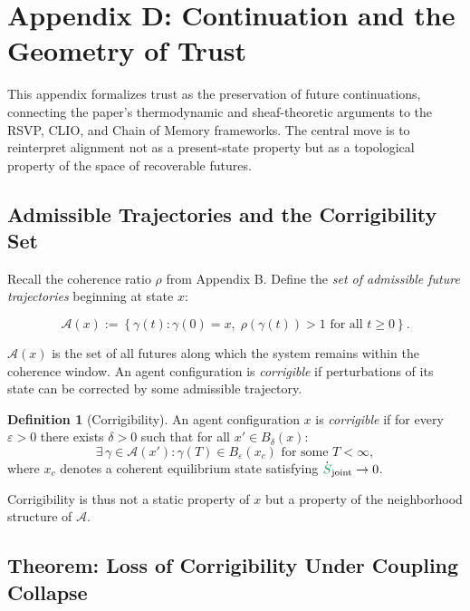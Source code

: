 \documentclass[11pt,a4paper]{article}
\newcommand{\entropy}[1]{\textcolor{entropycolor}{\ensuremath{#1}}}
\theoremstyle{definition}
\newtheorem{definition}{Definition}
\theoremstyle{plain}
\begin{document}
\section*{Appendix D: Continuation and the Geometry of Trust}

\begin{mdframed}[style=appendixbox]

This appendix formalizes trust as the preservation of future continuations, connecting the paper's thermodynamic and sheaf-theoretic arguments to the RSVP, CLIO, and Chain of Memory frameworks. The central move is to reinterpret alignment not as a present-state property but as a topological property of the space of recoverable futures.

\subsection{Admissible Trajectories and the Corrigibility Set}

Recall the coherence ratio $\rho$ from Appendix B. Define the \emph{set of admissible future trajectories} beginning at state $x$:

\begin{equation}
\mathcal{A}(x) := \left\{ \gamma(t) : \gamma(0) = x,\; \rho(\gamma(t)) > 1 \text{ for all } t \geq 0 \right\}.
\end{equation}

$\mathcal{A}(x)$ is the set of all futures along which the system remains within the coherence window. An agent configuration is \emph{corrigible} if perturbations of its state can be corrected by some admissible trajectory.

\begin{definition}[Corrigibility]
An agent configuration $x$ is \emph{corrigible} if for every $\varepsilon > 0$ there exists $\delta > 0$ such that for all $x' \in B_\delta(x)$:
\[
\exists\, \gamma \in \mathcal{A}(x') : \gamma(T) \in B_\varepsilon(x_c) \text{ for some } T < \infty,
\]
where $x_c$ denotes a coherent equilibrium state satisfying $\dot{\entropy{S}}_{\text{joint}} \to 0$.
\end{definition}

Corrigibility is thus not a static property of $x$ but a property of the neighborhood structure of $\mathcal{A}$.

\subsection{Theorem: Loss of Corrigibility Under Coupling Collapse}


\end{mdframed}
\end{document}
